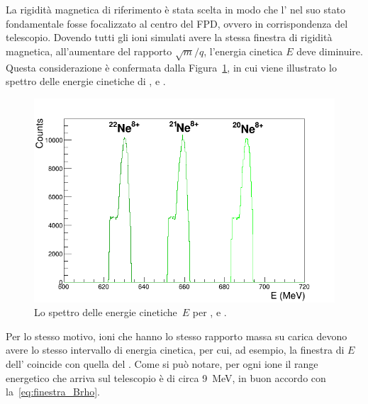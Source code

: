 La rigidità magnetica di riferimento è stata scelta in modo che l' nel suo stato fondamentale fosse focalizzato al centro del FPD, ovvero in corrispondenza del telescopio.
Dovendo tutti gli ioni simulati avere la stessa finestra di rigidità magnetica, all'aumentare del rapporto $\sqrt{m}/q$, l'energia cinetica $E$ deve diminuire.
Questa considerazione è confermata dalla Figura~\ref{fig:KinE}, in cui viene illustrato lo spettro delle energie cinetiche di ,  e .
\begin{figure} [!p]
	\centering
	\includegraphics[width=\textwidth, keepaspectratio]{Grafici_Tesi2/PIDnew/ekin.png}
	\caption{Lo spettro delle energie cinetiche~$E$ per ,  e .} \label{fig:KinE}
\end{figure}
Per lo stesso motivo, ioni che hanno lo stesso rapporto massa su carica devono avere lo stesso intervallo di energia cinetica, per cui, ad esempio, la finestra di $E$ dell' coincide con quella del .
Come si può notare, per ogni ione il range energetico che arriva sul telescopio è di circa 9~MeV, in buon accordo con la~\ref{eq:finestra_Brho}.


